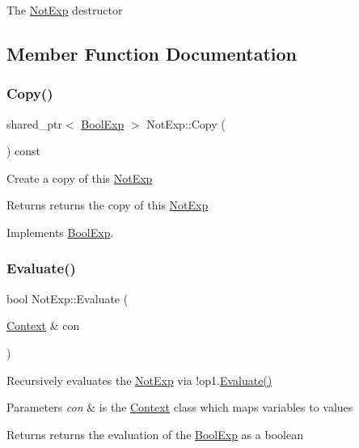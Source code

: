 The \mbox{\hyperlink{classNotExp}{Not\+Exp}} destructor 

\subsection{Member Function Documentation}
\mbox{\label{classNotExp_adb36074264fb55186f781680cb6c35f9}} 
\subsubsection{\texorpdfstring{Copy()}{Copy()}}
{\footnotesize\ttfamily shared\+\_\+ptr$<$ \mbox{\hyperlink{classBoolExp}{Bool\+Exp}} $>$ Not\+Exp\+::\+Copy (\begin{DoxyParamCaption}{ }\end{DoxyParamCaption}) const\hspace{0.3cm}{\ttfamily [virtual]}}

Create a copy of this \mbox{\hyperlink{classNotExp}{Not\+Exp}} \begin{DoxyReturn}{Returns}
returns the copy of this \mbox{\hyperlink{classNotExp}{Not\+Exp}} 
\end{DoxyReturn}


Implements \mbox{\hyperlink{classBoolExp_a846c30d1730cf645a040978a4cf7cdbb}{Bool\+Exp}}.

\mbox{\label{classNotExp_a4bf3ac9a898127b4d0c63db2a5f7a82f}} 
\subsubsection{\texorpdfstring{Evaluate()}{Evaluate()}}
{\footnotesize\ttfamily bool Not\+Exp\+::\+Evaluate (\begin{DoxyParamCaption}\item[{\mbox{\hyperlink{classContext}{Context}} \&}]{con }\end{DoxyParamCaption})\hspace{0.3cm}{\ttfamily [virtual]}}

Recursively evaluates the \mbox{\hyperlink{classNotExp}{Not\+Exp}} via !op1.\mbox{\hyperlink{classNotExp_a4bf3ac9a898127b4d0c63db2a5f7a82f}{Evaluate()}} 
\begin{DoxyParams}{Parameters}
{\em con} & is the \mbox{\hyperlink{classContext}{Context}} class which maps variables to values \\
\hline
\end{DoxyParams}
\begin{DoxyReturn}{Returns}
returns the evaluation of the \mbox{\hyperlink{classBoolExp}{Bool\+Exp}} as a boolean 
\end{DoxyReturn}


